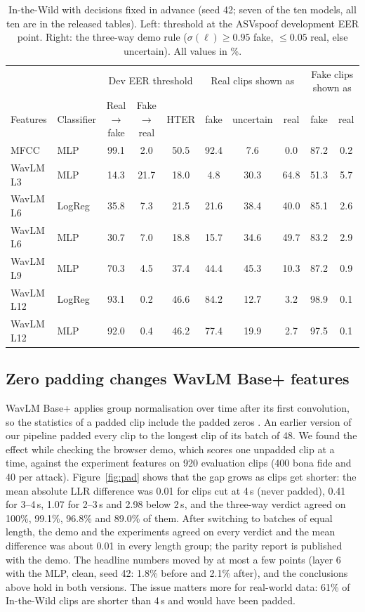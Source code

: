 \documentclass[10pt,a4paper]{article}
\begin{document}
\begin{table}[t]
\centering
\caption{In-the-Wild with decisions fixed in advance (seed 42; seven of the ten models, all ten are in the released tables). Left: threshold at the ASVspoof development EER
point. Right: the three-way demo rule ($\sigma(\ell)\ge0.95$ fake, $\le0.05$ real, else uncertain). All values in \%.}
\label{tab:itw}
\small
\begin{tabular}{llccc@{\hspace{1.2em}}ccc@{\hspace{1.2em}}cc}
\toprule
& & \multicolumn{3}{c}{Dev EER threshold} & \multicolumn{3}{c}{Real clips shown as} & \multicolumn{2}{c}{Fake clips shown as} \\
Features & Classifier & Real$\to$fake & Fake$\to$real & HTER & fake & uncertain & real & fake & real \\
\midrule
MFCC & MLP & 99.1 & 2.0 & 50.5 & 92.4 & 7.6 & 0.0 & 87.2 & 0.2 \\
WavLM L3 & MLP & 14.3 & 21.7 & 18.0 & 4.8 & 30.3 & 64.8 & 51.3 & 5.7 \\
WavLM L6 & LogReg & 35.8 & 7.3 & 21.5 & 21.6 & 38.4 & 40.0 & 85.1 & 2.6 \\
WavLM L6 & MLP & 30.7 & 7.0 & 18.8 & 15.7 & 34.6 & 49.7 & 83.2 & 2.9 \\
WavLM L9 & MLP & 70.3 & 4.5 & 37.4 & 44.4 & 45.3 & 10.3 & 87.2 & 0.9 \\
WavLM L12 & LogReg & 93.1 & 0.2 & 46.6 & 84.2 & 12.7 & 3.2 & 98.9 & 0.1 \\
WavLM L12 & MLP & 92.0 & 0.4 & 46.2 & 77.4 & 19.9 & 2.7 & 97.5 & 0.1 \\
\bottomrule
\end{tabular}
\end{table}

\subsection{Zero padding changes WavLM Base+ features}
\label{sec:padding}
WavLM Base+ applies group normalisation over time after its first convolution, so the statistics of a padded clip
include the padded zeros \cite{hf2023padding}. An earlier version of our pipeline padded every clip to the longest
clip of its batch of 48. We found the effect while checking the browser demo, which scores one unpadded clip at a
time, against the experiment features on 920 evaluation clips (400 bona fide and 40 per attack). Figure~\ref{fig:pad}
shows that the gap grows as clips get shorter: the mean absolute LLR difference was 0.01 for clips cut at 4\,s (never
padded), 0.41 for 3--4\,s, 1.07 for 2--3\,s and 2.98 below 2\,s, and the three-way verdict agreed on 100\%, 99.1\%,
96.8\% and 89.0\% of them. After switching to batches of equal length, the demo and the experiments agreed on every verdict and the mean difference was about 0.01 in every length group; the parity report is published with the demo. The headline numbers moved by at most a few
points (layer 6 with the MLP, clean, seed 42: 1.8\% before and 2.1\% after), and the conclusions above hold in both
versions. The issue matters more for real-world data: 61\% of In-the-Wild clips are shorter than 4\,s and would have
been padded.
\end{document}
